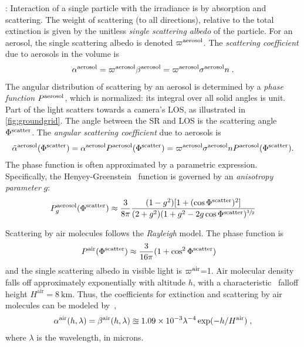 \documentclass[10pt,letterpaper]{article}
\begin{document}
: Interaction of a single particle with the
irradiance is by absorption and scattering. The weight of scattering
(to all directions), relative to the total extinction is given by the
unitless {\em single scattering albedo} of the particle. For an
aerosol, the single scattering albedo is denoted $\varpi^{\rm
  aerosol}$.  The {\em scattering coefficient} due to aerosols in the
volume is
\begin{align}
  \alpha^{\rm aerosol}= \varpi^{\rm aerosol}\beta^{\rm aerosol}
  =\varpi^{\rm aerosol} \sigma^{\rm aerosol} n \;.
  \label{eq:alph}
\end{align}
The angular distribution of scattering by an aerosol is determined by
a {\em phase function} $P^{\rm aerosol}$, which is normalized: its
integral over all solid angles is unit. Part of the light scatters
towards a camera's LOS, as illustrated in \cref{fig:groundgrid}. The
angle between the SR and LOS is the scattering angle $\Phi^{\rm
  scatter}$. The {\em angular scattering coefficient} due to aerosols
is
\begin{align}
  \tilde\alpha^{\rm aerosol}(\Phi^{\rm scatter}) = \alpha^{\rm
    aerosol} P^{\rm aerosol}(\Phi^{\rm scatter}) = \varpi^{\rm
    aerosol} \sigma^{\rm aerosol} n P^{\rm aerosol}(\Phi^{\rm
    scatter}).
  \label{eq:alphabasic}
\end{align}
The phase function is often approximated by a parametric
expression. Specifically, the Henyey-Greenstein~\cite{Cornette1995}
function is governed by an {\em anisotropy parameter} $g$:
\begin{align}
  P^{\rm aerosol}_g(\Phi^{\rm scatter})\approx \frac{3}{8\pi} \frac{(1 -g^2)
  [1+(\cos \Phi^{\rm scatter})^2]}
  {(2+g^2)(1 + g^2 - 2g\cos \Phi^{\rm scatter})^{\sfrac{3}{2}}}
  \label{eq:aerosol_scatter}
\end{align}

Scattering by air molecules follows the {\em Rayleigh} model. The
phase function is
\begin{align}
  P^{\rm air}(\Phi^{\rm scatter}) &\approx
  \frac{3}{16\pi}(1+\cos^2\Phi^{\rm scatter})
  \label{eq:rayleighP}
\end{align}
and the single scattering albedo in visible light is $\varpi^{\rm
  air}$=1. Air molecular density falls off approximately exponentially
with altitude $h$, with a characteristic~\cite{Levi1980} falloff
height $H^\mathrm{air}=8\ \si{\km}$. Thus, the
coefficients for extinction and scattering by air molecules can be
modeled by~\cite{Levi1980},
\begin{align}
  \alpha^{\rm air}(h, \lambda)=\beta^{\rm air}(h, \lambda) \approxeq
  1.09 \times 10^{-3}\lambda^{-4} \exp(-h/H^\mathrm{air})
  \;,%
  \label{eq:rayleighbeta}
\end{align}
where $\lambda$ is the wavelength, in microns.
\\
\end{document}
